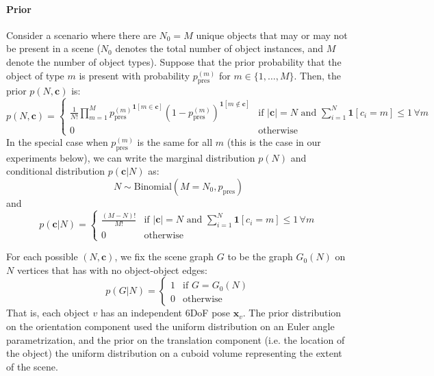 \paragraph{Prior}
Consider a scenario where there are $N_0 = M$ unique objects that may or may not be present in a scene
($N_0$ denotes the total number of object instances, and $M$ denote the number of object types).
Suppose that the prior probability that the object of type $m$ is present with probability $p_{\mathrm{pres}}^{(m)}$ for $m \in \{1, \ldots, M\}$.
Then, the prior $p(N, \mathbf{c})$ is:
\begin{equation}
p(N, \mathbf{c}) =
\left\{
\begin{array}{ll}
\frac{1}{N!} \prod_{m=1}^M {p_{\mathrm{pres}}^{(m)}}^{\mathbf{1}[m \in \mathbf{c}]} {(1 - p_{\mathrm{pres}}^{(m)})}^{\mathbf{1}[m \not \in \mathbf{c}]} &
\mbox{if } |\mathbf{c}| = N \mbox{ and } \sum_{i=1}^N \mathbf{1}[c_i = m] \le 1\, \forall m\\
0 & \mbox{otherwise}
\end{array}
\right.
\end{equation}
In the special case when $p_{\mathrm{pres}}^{(m)}$ is the same for all $m$ (this is the case in our experiments below), we can write the marginal distribution $p(N)$ and conditional distribution $p(\mathbf{c} | N)$ as:
\begin{equation}
N \sim \mathrm{Binomial}(M = N_0, p_{\mathrm{pres}})
\end{equation}
and
\begin{equation}
p(\mathbf{c} | N) =
\left\{
\begin{array}{ll}
\frac{(M - N)!}{M!} &
\mbox{if } |\mathbf{c}| = N \mbox{ and } \sum_{i=1}^N \mathbf{1}[c_i = m] \le 1\, \forall m\\
0 &
\mbox{otherwise}
\end{array}
\right.
\end{equation}

For each possible $(N, \mathbf{c})$, we fix the scene graph $G$ to be the graph $G_0(N)$ on $N$ vertices that has with no object-object edges:
\begin{equation}
p(G | N) = \left\{
\begin{array}{ll}
1 & \mbox{if } G = G_0(N)\\
0 & \mbox{otherwise}
\end{array}
\right.
\end{equation}
That is, each object $v$ has an independent 6DoF pose $\mathbf{x}_v$.
The prior distribution on the orientation component used the uniform distribution on an Euler angle parametrization,
and the prior on the translation component (i.e. the location of the object) the uniform distribution on a cuboid volume representing the extent of the scene.

